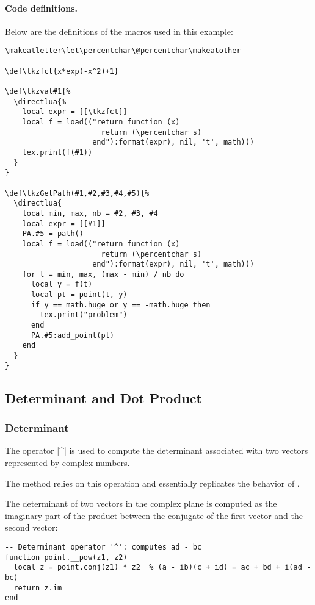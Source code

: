 \paragraph{Code definitions.}
Below are the definitions of the macros used in this example:

\begin{verbatim}
\makeatletter\let\percentchar\@percentchar\makeatother

\def\tkzfct{x*exp(-x^2)+1}

\def\tkzval#1{%
  \directlua{%
    local expr = [[\tkzfct]]
    local f = load(("return function (x)
                      return (\percentchar s)
                    end"):format(expr), nil, 't', math)()
    tex.print(f(#1))
  }
}

\def\tkzGetPath(#1,#2,#3,#4,#5){%
  \directlua{
    local min, max, nb = #2, #3, #4
    local expr = [[#1]]
    PA.#5 = path()
    local f = load(("return function (x)
                      return (\percentchar s)
                    end"):format(expr), nil, 't', math)()
    for t = min, max, (max - min) / nb do
      local y = f(t)
      local pt = point(t, y)
      if y == math.huge or y == -math.huge then
        tex.print("problem")
      end
      PA.#5:add_point(pt)
    end
  }
}
\end{verbatim}



\subsection{Determinant and Dot Product}
\label{sub:determinant_et_produit_scalaire}


\subsubsection{Determinant}
\label{ssub:determinant}

The operator |^| is used to compute the determinant associated with two vectors represented by complex numbers.

The  method relies on this operation and essentially replicates the behavior of .

The determinant of two vectors in the complex plane is computed as the imaginary part of the product between the conjugate of the first vector and the second vector:

\begin{verbatim}
-- Determinant operator '^': computes ad - bc
function point.__pow(z1, z2)
  local z = point.conj(z1) * z2  % (a - ib)(c + id) = ac + bd + i(ad - bc)
  return z.im
end
\end{verbatim}

